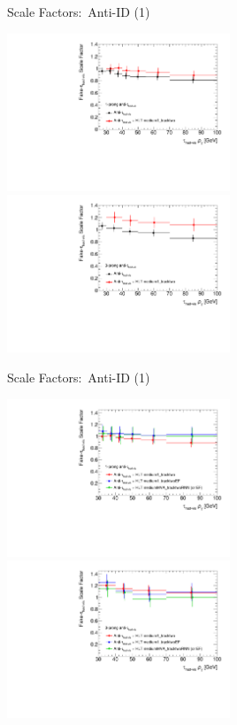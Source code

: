 \documentclass[11pt, xcolor={dvipsnames}, aspectratio=169]{beamer}
\begin{document}
\begin{frame}{Scale Factors:\ Anti-ID (1)}
  \centering

  \includegraphics[width=0.5\textwidth]{ttbarSF/scale_factors/ttbarSF_antitau_offl_tau25_1p}%
  \includegraphics[width=0.5\textwidth]{ttbarSF/scale_factors/ttbarSF_antitau_offl_tau25_3p}
\end{frame}


\begin{frame}{Scale Factors:\ Anti-ID (1)}
  \centering

  \includegraphics[width=0.5\textwidth]{ttbarSF/scale_factors/ttbarSF_antitau_tau25_1p}%
  \includegraphics[width=0.5\textwidth]{ttbarSF/scale_factors/ttbarSF_antitau_tau25_3p}
\end{frame}
\end{document}
